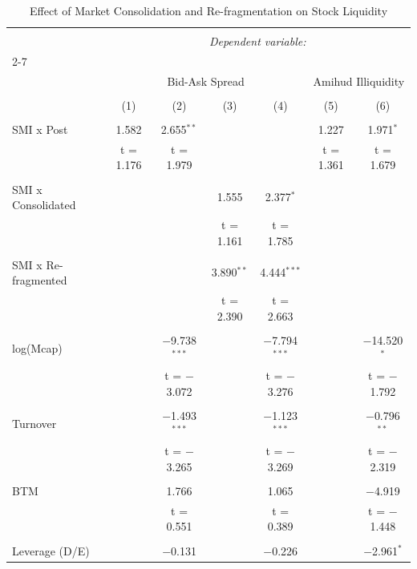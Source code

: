 
\begin{table}[H] \centering 
  \caption{Effect of Market Consolidation and Re-fragmentation on Stock Liquidity} 
  \label{tab:did} 
\scriptsize 
\begin{tabular}{@{\extracolsep{5pt}}lcccccc} 
\\[-1.8ex]\hline 
\hline \\[-1.8ex] 
 & \multicolumn{6}{c}{\textit{Dependent variable:}} \\ 
\cline{2-7} 
\\[-1.8ex] & \multicolumn{4}{c}{Bid-Ask Spread} & \multicolumn{2}{c}{Amihud Illiquidity} \\ 
\\[-1.8ex] & (1) & (2) & (3) & (4) & (5) & (6)\\ 
\hline \\[-1.8ex] 
 SMI x Post & 1.582 & 2.655$^{**}$ &  &  & 1.227 & 1.971$^{*}$ \\ 
  & t = 1.176 & t = 1.979 &  &  & t = 1.361 & t = 1.679 \\ 
  & & & & & & \\ 
 SMI x Consolidated &  &  & 1.555 & 2.377$^{*}$ &  &  \\ 
  &  &  & t = 1.161 & t = 1.785 &  &  \\ 
  & & & & & & \\ 
 SMI x Re-fragmented &  &  & 3.890$^{**}$ & 4.444$^{***}$ &  &  \\ 
  &  &  & t = 2.390 & t = 2.663 &  &  \\ 
  & & & & & & \\ 
 log(Mcap) &  & $-$9.738$^{***}$ &  & $-$7.794$^{***}$ &  & $-$14.520$^{*}$ \\ 
  &  & t = $-$3.072 &  & t = $-$3.276 &  & t = $-$1.792 \\ 
  & & & & & & \\ 
 Turnover &  & $-$1.493$^{***}$ &  & $-$1.123$^{***}$ &  & $-$0.796$^{**}$ \\ 
  &  & t = $-$3.265 &  & t = $-$3.269 &  & t = $-$2.319 \\ 
  & & & & & & \\ 
 BTM &  & 1.766 &  & 1.065 &  & $-$4.919 \\ 
  &  & t = 0.551 &  & t = 0.389 &  & t = $-$1.448 \\ 
  & & & & & & \\ 
 Leverage (D/E) &  & $-$0.131 &  & $-$0.226 &  & $-$2.961$^{*}$ \\ 

\end{tabular}
\end{table}
